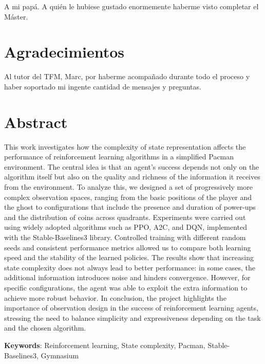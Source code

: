 A mi papá. A quién le hubiese gustado enormemente haberme visto completar el Máster.

\chapter*{Agradecimientos}

Al tutor del TFM, Marc, por haberme acompañado durante todo el proceso y haber soportado mi ingente cantidad de mensajes y preguntas.

\chapter*{Abstract}

\onehalfspacing

This work investigates how the complexity of state representation affects the performance of reinforcement learning algorithms in a simplified Pacman environment. The central idea is that an agent’s success depends not only on the algorithm itself but also on the quality and richness of the information it receives from the environment. To analyze this, we designed a set of progressively more complex observation spaces, ranging from the basic positions of the player and the ghost to configurations that include the presence and duration of power-ups and the distribution of coins across quadrants.
Experiments were carried out using widely adopted algorithms such as PPO, A2C, and DQN, implemented with the Stable-Baselines3 library. Controlled training with different random seeds and consistent performance metrics allowed us to compare both learning speed and the stability of the learned policies.
The results show that increasing state complexity does not always lead to better performance: in some cases, the additional information introduces noise and hinders convergence. However, for specific configurations, the agent was able to exploit the extra information to achieve more robust behavior.
In conclusion, the project highlights the importance of observation design in the success of reinforcement learning agents, stressing the need to balance simplicity and expressiveness depending on the task and the chosen algorithm.

\vspace{1.5cm}

\textbf{Keywords}: Reinforcement learning, State complexity, Pacman, Stable-Baselines3, Gymnasium

